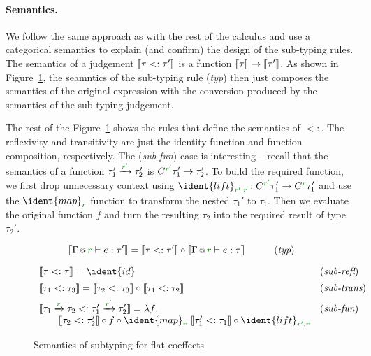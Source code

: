
\paragraph{Semantics.} We follow the same approach as with the rest of the calculus and use
a categorical semantics to explain (and confirm) the design of the sub-typing rules. The semantics
of a judgement $\llbracket \tau <: \tau' \rrbracket$ is a function $\llbracket \tau \rrbracket \rightarrow \llbracket \tau' \rrbracket$. 
As shown in Figure~\ref{fig:flat-semantics-sub}, the seamntics of the sub-typing rule (\emph{typ}) 
then just composes the semantics of the original expression with the conversion produced by the 
semantics of the sub-typing judgement.

The rest of the Figure~\ref{fig:flat-semantics-sub} shows the rules that define the semantics
of $<:$. The reflexivity and transitivity are just the identity function and function composition,
respectively. The (\emph{sub-fun}) case is interesting -- recall that the semantics of a function
$\tau_1' \xrightarrow{\cclrd{r'}} \tau_2'$ is $C^{\cclrd{r'}} \tau_1' \rightarrow \tau_2'$. To 
build the required function, we first drop unnecessary context using $\ident{lift}_{\cclrd{r'}, \cclrd{r}}
 : C^{\cclrd{r'}} \tau_1' \rightarrow C^{\cclrd{r}} \tau_1'$ and use the $\ident{map}_{\cclrd{r}}$
function to transform the nested $\tau_1'$ to $\tau_1$. Then we evaluate the original function $f$
and turn the resulting $\tau_2$ into the required result of type $\tau_2'$.


\begin{figure}[t]

\begin{equation*}
\sem{\coctx{\Gamma}{\cclrd{r}} \vdash e : \tau' } = 
  \sem{\tau <: \tau'} \circ \sem{\coctx{\Gamma}{\cclrd{r}} \vdash e : \tau } \qquad\quad (\emph{typ})
\end{equation*}

\begin{equation*}
\begin{array}{ll}
\sem{\tau <: \tau} = \ident{id} & (\emph{sub-refl})
\\[0.5em]
\sem{\tau_1 <: \tau_3} = \sem{\tau_2 <: \tau_3} \circ \sem{\tau_1 <: \tau_2} & (\emph{sub-trans})
\\[0.5em]
\sem{\tau_1 \xrightarrow{\cclrd{r}} \tau_2 <: \tau_1' \xrightarrow{\cclrd{r'}} \tau_2'} = \lambda f. & (\emph{sub-fun}) \\
\qquad\sem{\tau_2 <: \tau_2'} \circ f \circ \ident{map}_{\cclrd{r}}~\sem{\tau_1' <: \tau_1} 
  \circ \ident{lift}_{\cclrd{r'}, \cclrd{r}}
\end{array}
\end{equation*}

\caption{Semantics of subtyping for flat coeffects}
\label{fig:flat-semantics-sub}
\end{figure}

